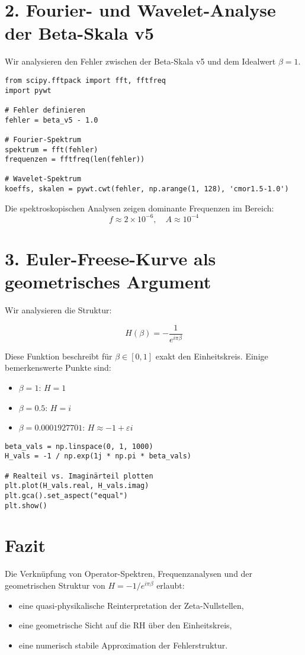 \documentclass[a4paper,12pt]{article}
\begin{document}
\section{2. Fourier- und Wavelet-Analyse der Beta-Skala v5}
Wir analysieren den Fehler zwischen der Beta-Skala v5 und dem Idealwert $\beta = 1$.

\begin{verbatim}
from scipy.fftpack import fft, fftfreq
import pywt

# Fehler definieren
fehler = beta_v5 - 1.0

# Fourier-Spektrum
spektrum = fft(fehler)
frequenzen = fftfreq(len(fehler))

# Wavelet-Spektrum
koeffs, skalen = pywt.cwt(fehler, np.arange(1, 128), 'cmor1.5-1.0')
\end{verbatim}

Die spektroskopischen Analysen zeigen dominante Frequenzen im Bereich:
\[
f \approx 2 \times 10^{-6}, \quad A \approx 10^{-4}
\]

\section{3. Euler-Freese-Kurve als geometrisches Argument}
Wir analysieren die Struktur:

\[
H(\beta) = -\frac{1}{e^{i\pi \beta}}
\]

Diese Funktion beschreibt für $\beta \in [0, 1]$ exakt den Einheitskreis. Einige bemerkenswerte Punkte sind:

\begin{itemize}
    \item $\beta = 1$: $H = 1$
    \item $\beta = 0.5$: $H = i$
    \item $\beta = 0.0001927701$: $H \approx -1 + \varepsilon i$
\end{itemize}

\begin{verbatim}
beta_vals = np.linspace(0, 1, 1000)
H_vals = -1 / np.exp(1j * np.pi * beta_vals)

# Realteil vs. Imaginärteil plotten
plt.plot(H_vals.real, H_vals.imag)
plt.gca().set_aspect("equal")
plt.show()
\end{verbatim}

\section{Fazit}
Die Verknüpfung von Operator-Spektren, Frequenzanalysen und der geometrischen Struktur von $H = -1 / e^{i\pi \beta}$ erlaubt:
\begin{itemize}
    \item eine quasi-physikalische Reinterpretation der Zeta-Nullstellen,
    \item eine geometrische Sicht auf die RH über den Einheitskreis,
    \item eine numerisch stabile Approximation der Fehlerstruktur.
\end{itemize}
\end{document}
